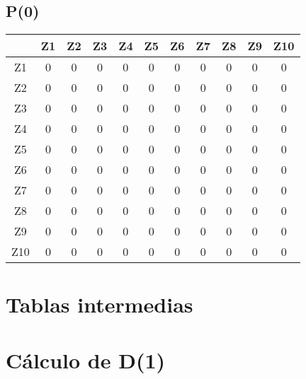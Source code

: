 \documentclass[a4paper,11pt]{article}
\begin{document}
\subsection*{P(0)}
\begin{center}
\begin{tabular}{c|cccccccccc}
 & Z1 & Z2 & Z3 & Z4 & Z5 & Z6 & Z7 & Z8 & Z9 & Z10 \\ \hline
Z1 & 0 & 0 & 0 & 0 & 0 & 0 & 0 & 0 & 0 & 0 \\
Z2 & 0 & 0 & 0 & 0 & 0 & 0 & 0 & 0 & 0 & 0 \\
Z3 & 0 & 0 & 0 & 0 & 0 & 0 & 0 & 0 & 0 & 0 \\
Z4 & 0 & 0 & 0 & 0 & 0 & 0 & 0 & 0 & 0 & 0 \\
Z5 & 0 & 0 & 0 & 0 & 0 & 0 & 0 & 0 & 0 & 0 \\
Z6 & 0 & 0 & 0 & 0 & 0 & 0 & 0 & 0 & 0 & 0 \\
Z7 & 0 & 0 & 0 & 0 & 0 & 0 & 0 & 0 & 0 & 0 \\
Z8 & 0 & 0 & 0 & 0 & 0 & 0 & 0 & 0 & 0 & 0 \\
Z9 & 0 & 0 & 0 & 0 & 0 & 0 & 0 & 0 & 0 & 0 \\
Z10 & 0 & 0 & 0 & 0 & 0 & 0 & 0 & 0 & 0 & 0 \\
\end{tabular}
\end{center}
\newpage
\section*{Tablas intermedias}
\section*{Cálculo de D(1)}
\end{document}
